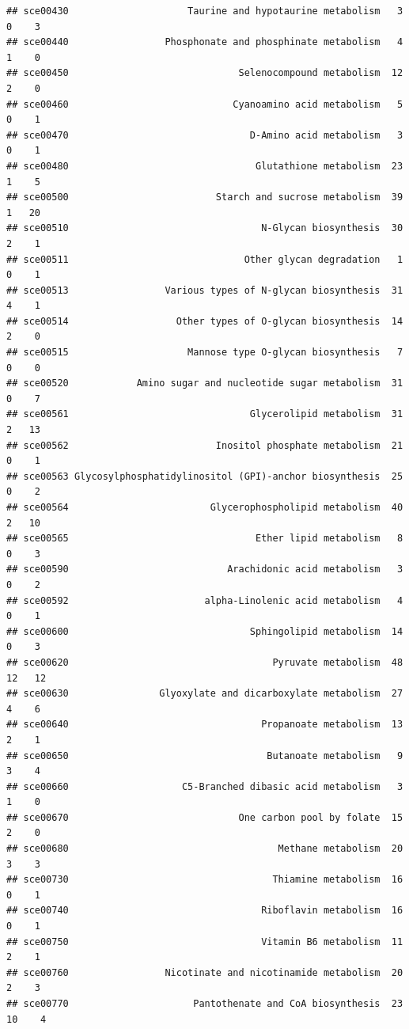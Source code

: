 \documentclass[
]{book}
\begin{document}
\begin{verbatim}
## sce00430                     Taurine and hypotaurine metabolism   3  0    3
## sce00440                 Phosphonate and phosphinate metabolism   4  1    0
## sce00450                              Selenocompound metabolism  12  2    0
## sce00460                             Cyanoamino acid metabolism   5  0    1
## sce00470                                D-Amino acid metabolism   3  0    1
## sce00480                                 Glutathione metabolism  23  1    5
## sce00500                          Starch and sucrose metabolism  39  1   20
## sce00510                                  N-Glycan biosynthesis  30  2    1
## sce00511                               Other glycan degradation   1  0    1
## sce00513                 Various types of N-glycan biosynthesis  31  4    1
## sce00514                   Other types of O-glycan biosynthesis  14  2    0
## sce00515                     Mannose type O-glycan biosynthesis   7  0    0
## sce00520            Amino sugar and nucleotide sugar metabolism  31  0    7
## sce00561                                Glycerolipid metabolism  31  2   13
## sce00562                          Inositol phosphate metabolism  21  0    1
## sce00563 Glycosylphosphatidylinositol (GPI)-anchor biosynthesis  25  0    2
## sce00564                         Glycerophospholipid metabolism  40  2   10
## sce00565                                 Ether lipid metabolism   8  0    3
## sce00590                            Arachidonic acid metabolism   3  0    2
## sce00592                        alpha-Linolenic acid metabolism   4  0    1
## sce00600                                Sphingolipid metabolism  14  0    3
## sce00620                                    Pyruvate metabolism  48 12   12
## sce00630                Glyoxylate and dicarboxylate metabolism  27  4    6
## sce00640                                  Propanoate metabolism  13  2    1
## sce00650                                   Butanoate metabolism   9  3    4
## sce00660                    C5-Branched dibasic acid metabolism   3  1    0
## sce00670                              One carbon pool by folate  15  2    0
## sce00680                                     Methane metabolism  20  3    3
## sce00730                                    Thiamine metabolism  16  0    1
## sce00740                                  Riboflavin metabolism  16  0    1
## sce00750                                  Vitamin B6 metabolism  11  2    1
## sce00760                 Nicotinate and nicotinamide metabolism  20  2    3
## sce00770                      Pantothenate and CoA biosynthesis  23 10    4

\end{verbatim}
\end{document}
